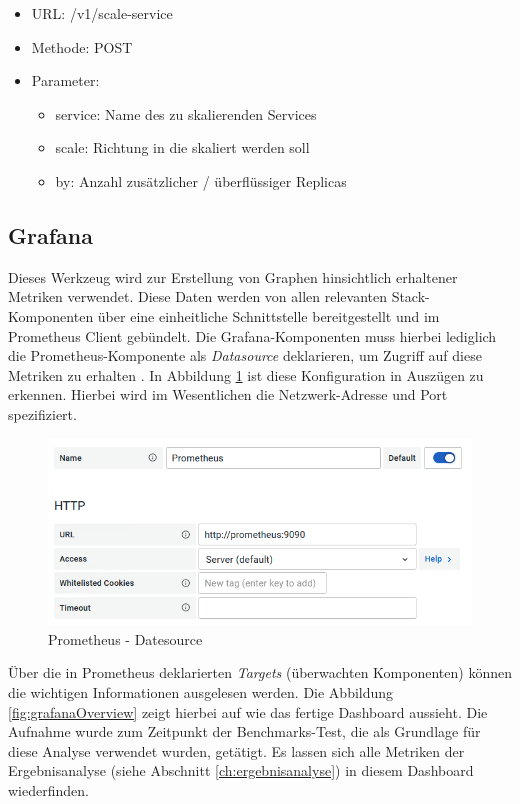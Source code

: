 \begin{itemize}
  \item URL: /v1/scale-service
  \item Methode: POST
  \item Parameter:
  \begin{itemize}
    \item service: Name des zu skalierenden Services
    \item scale: Richtung in die skaliert werden soll 
    \item by: Anzahl zusätzlicher / überflüssiger Replicas
  \end{itemize}
\end{itemize}

\subsection{Grafana \checkmark}

Dieses Werkzeug wird zur Erstellung von Graphen hinsichtlich erhaltener Metriken verwendet. Diese Daten werden von allen relevanten Stack-Komponenten über eine einheitliche Schnittstelle bereitgestellt und im Prometheus Client gebündelt. Die Grafana-Komponenten muss hierbei lediglich die Prometheus-Komponente als \emph{Datasource} deklarieren, um Zugriff auf diese Metriken zu erhalten \cite[Seite~99 ff.]{oreillyPrometheus}. In Abbildung \ref{fig:prometheusDatasource} ist diese Konfiguration in Auszügen zu erkennen. Hierbei wird im Wesentlichen die Netzwerk-Adresse und Port spezifiziert. 

\begin{figure}[ht!]
	\centering
	\includegraphics[width=.9\linewidth]{kapitel/problemloesung/implementierung/_img/prometheus-datasource}
	\caption[Prometheus - Datesource]{Prometheus - Datesource}
	\label{fig:prometheusDatasource}
\end{figure}

Über die in Prometheus deklarierten \emph{Targets} (überwachten Komponenten) können die wichtigen Informationen ausgelesen werden. Die Abbildung \ref{fig:grafanaOverview} zeigt hierbei auf wie das fertige Dashboard aussieht. Die Aufnahme wurde zum Zeitpunkt der Benchmarks-Test, die als Grundlage für diese Analyse verwendet wurden, getätigt. Es lassen sich alle Metriken der Ergebnisanalyse (siehe Abschnitt \ref{ch:ergebnisanalyse}) in diesem Dashboard wiederfinden. 

